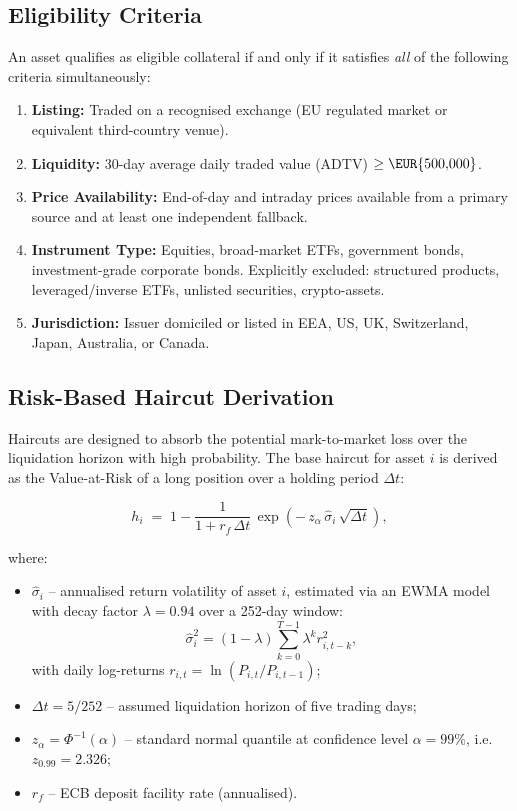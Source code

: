 \documentclass[12pt, a4paper]{article}
\newcommand{\1}{\mathbbm{1}}
\begin{document}
\subsection{Eligibility Criteria}
An asset qualifies as eligible collateral if and only if it satisfies \emph{all}
of the following criteria simultaneously:
\begin{enumerate}[leftmargin=1.5em]
    \item \textbf{Listing:} Traded on a recognised exchange (EU regulated market
    or equivalent third-country venue).
    \item \textbf{Liquidity:} 30-day average daily traded value (ADTV)
    $\geq \EUR{500{,}000}$.
    \item \textbf{Price Availability:} End-of-day and intraday prices available
    from a primary source and at least one independent fallback.
    \item \textbf{Instrument Type:} Equities, broad-market ETFs, government bonds,
    investment-grade corporate bonds. Explicitly excluded: structured products,
    leveraged/inverse ETFs, unlisted securities, crypto-assets.
    \item \textbf{Jurisdiction:} Issuer domiciled or listed in EEA, US, UK,
    Switzerland, Japan, Australia, or Canada.
\end{enumerate}

\subsection{Risk-Based Haircut Derivation}
\label{subsec:haircut}

Haircuts are designed to absorb the potential mark-to-market loss over the
liquidation horizon with high probability. The base haircut for asset $i$ is
derived as the Value-at-Risk of a long position over a holding period $\Delta t$:

\begin{equation}
    h_i \;=\; 1 - \frac{1}{1 + r_f\,\Delta t}\,
    \exp\!\left(-\,z_\alpha\,\hat{\sigma}_i\,\sqrt{\Delta t}\right),
    \label{eq:haircut}
\end{equation}

where:
\begin{itemize}[leftmargin=1.5em]
    \item $\hat{\sigma}_i$ -- annualised return volatility of asset $i$, estimated
    via an EWMA model with decay factor $\lambda = 0.94$ over a 252-day window:
    \[
    \hat{\sigma}_i^2 = (1-\lambda)\sum_{k=0}^{T-1}\lambda^k r_{i,t-k}^2,
    \]
    with daily log-returns $r_{i,t} = \ln(P_{i,t}/P_{i,t-1})$;
    \item $\Delta t = 5/252$ -- assumed liquidation horizon of five trading days;
    \item $z_\alpha = \Phi^{-1}(\alpha)$ -- standard normal quantile at confidence
    level $\alpha = 99\%$, i.e.\ $z_{0.99} = 2.326$;
    \item $r_f$ -- ECB deposit facility rate (annualised).
\end{itemize}
\end{document}
